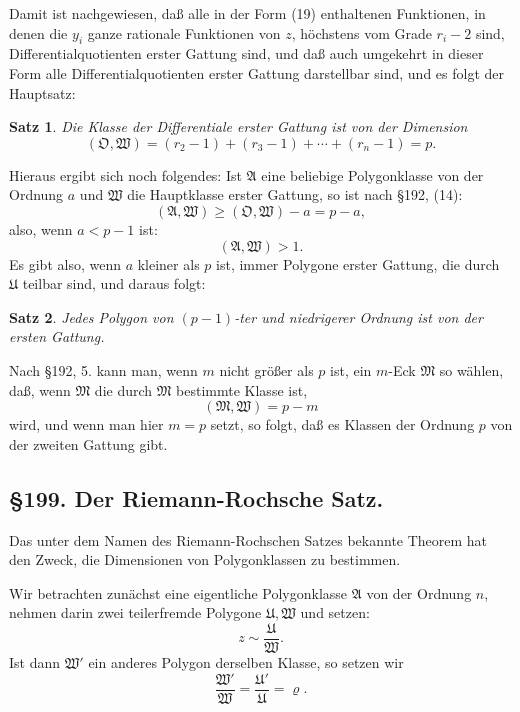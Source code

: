 \documentclass[12pt,a4paper]{article}
\newtheorem*{satz}{Satz}
\begin{document}
Damit ist nachgewiesen, daß alle in der Form (19) enthaltenen Funktionen, in denen die $y_i$ ganze rationale Funktionen von $z$, höchstens vom Grade $r_i - 2$ sind, Differentialquotienten erster Gattung sind, und daß auch umgekehrt in dieser Form alle Differentialquotienten erster Gattung darstellbar sind, und es folgt der Hauptsatz:

\begin{satz}
Die Klasse der Differentiale erster Gattung ist von der Dimension
\begin{equation}\label{eq:198-dim}
(\mathfrak{O}, \mathfrak{W}) = (r_2 - 1) + (r_3 - 1) + \cdots + (r_n - 1) = p.
\end{equation}
\end{satz}

Hieraus ergibt sich noch folgendes: Ist $\mathfrak{A}$ eine beliebige Polygonklasse von der Ordnung $a$ und $\mathfrak{W}$ die Hauptklasse erster Gattung, so ist nach \S 192, (14):
\[
(\mathfrak{A}, \mathfrak{W}) \geq (\mathfrak{O}, \mathfrak{W}) - a = p - a,
\]
also, wenn $a < p - 1$ ist:
\[
(\mathfrak{A}, \mathfrak{W}) > 1.
\]
Es gibt also, wenn $a$ kleiner als $p$ ist, immer Polygone erster Gattung, die durch $\mathfrak{U}$ teilbar sind, und daraus folgt:

\begin{satz}
Jedes Polygon von $(p-1)$-ter und niedrigerer Ordnung ist von der ersten Gattung.
\end{satz}

Nach \S 192, 5. kann man, wenn $m$ nicht größer als $p$ ist, ein $m$-Eck $\mathfrak{M}$ so wählen, daß, wenn $\mathfrak{M}$ die durch $\mathfrak{M}$ bestimmte Klasse ist,
\[
(\mathfrak{M}, \mathfrak{W}) = p - m
\]
wird, und wenn man hier $m = p$ setzt, so folgt, daß es Klassen der Ordnung $p$ von der zweiten Gattung gibt.

\subsection*{\S 199. Der Riemann-Rochsche Satz.}

Das unter dem Namen des Riemann-Rochschen Satzes bekannte Theorem hat den Zweck, die Dimensionen von Polygonklassen zu bestimmen.

Wir betrachten zunächst eine eigentliche Polygonklasse $\mathfrak{A}$ von der Ordnung $n$, nehmen darin zwei teilerfremde Polygone $\mathfrak{U}, \mathfrak{W}$ und setzen:
\[
z \sim \frac{\mathfrak{U}}{\mathfrak{W}}.
\]
Ist dann $\mathfrak{W}'$ ein anderes Polygon derselben Klasse, so setzen wir
\[
\frac{\mathfrak{W}'}{\mathfrak{W}} = \frac{\mathfrak{U}'}{\mathfrak{U}} = \varrho.
\]
\end{document}
